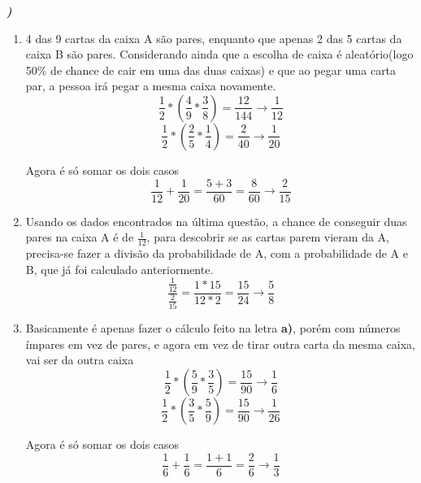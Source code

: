 \documentclass[12pt]{article}
\newcounter{instn}
\newcommand{\instnum}{\arabic{instn}}
\newcommand{\myline}[1]{
    \emph{\textbf{#1)}}
    \addtocounter{instn}{1}
}
\newenvironment{question}
 {
    \myline{\instnum} 
    }
    {
 }
\begin{document}
    \begin{question}

        \begin{enumerate}[label={\textbf{\alph*)}}]
            \item 4 das 9 cartas da caixa A são pares, enquanto que apenas 2 das 5 cartas da caixa B são pares.
            Considerando ainda que a escolha de caixa é aleatório(logo 50\% de chance de cair em uma das duas caixas) e 
            que ao pegar uma carta par, a pessoa irá pegar a mesma caixa novamente.
            \[
                \frac{1}{2}*(\frac{4}{9} * \frac{3}{8}) = \frac{12}{144} \rightarrow \frac{1}{12}
            \]
            \[
                \frac{1}{2}*(\frac{2}{5} * \frac{1}{4}) = \frac{2}{40} \rightarrow \frac{1}{20}
            \]

            Agora é só somar os dois casos 
            \begin{equation}
                \frac{1}{12} + \frac{1}{20} = \frac{5+3}{60} = \frac{8}{60} \rightarrow \frac{2}{15}
            \end{equation}
            \item Usando os dados encontrados na última questão, a chance de conseguir duas pares na caixa A é de 
            $\frac{1}{12}$, para descobrir se as cartas parem vieram da A, precisa-se fazer a divisão da probabilidade de A,
            com a probabilidade de A e B, que já foi calculado anteriormente.
            \begin{equation}
                \frac{\frac{1}{12}}{\frac{2}{15}} = \frac{1 * 15}{12 * 2} = \frac{15}{24} \rightarrow \frac{5}{8}
            \end{equation}

            \item Basicamente é apenas fazer o cálculo feito na letra \textbf{a)}, porém com números ímpares em vez de pares, e agora 
            em vez de tirar outra carta da mesma caixa, vai ser da outra caixa 
            \[
                \frac{1}{2}*(\frac{5}{9} * \frac{3}{5}) = \frac{15}{90} \rightarrow \frac{1}{6}
            \]
            \[
                \frac{1}{2}*(\frac{3}{5} * \frac{5}{9}) = \frac{15}{90} \rightarrow \frac{1}{26}
            \]

            Agora é só somar os dois casos 
            \begin{equation}
                \frac{1}{6} + \frac{1}{6} = \frac{1+1}{6} = \frac{2}{6} \rightarrow \frac{1}{3}
            \end{equation}
               
        \end{enumerate}
    \end{question}
\end{document}
